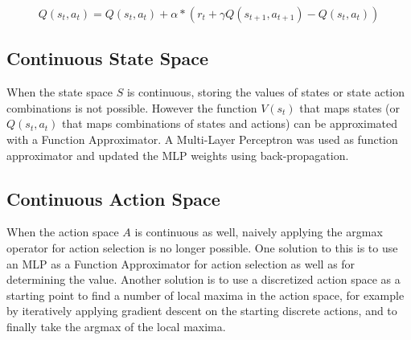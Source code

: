 \begin{equation}
\label{eq:upd_q}
Q(s_t,a_t) = Q(s_t,a_t) + \alpha*(r_t + \gamma Q(s_{t+1},a_{t+1}) - Q(s_t, a_t))
\end{equation}

\subsection{Continuous State Space}

When the state space $S$ is continuous, storing the values of states or state action combinations is not possible. However the function $V(s_t)$ that maps states (or $Q(s_t,a_t)$ that maps combinations of states and actions) can be approximated with a Function Approximator. A Multi-Layer Perceptron was used as function approximator and updated the MLP weights using back-propagation.

\subsection{Continuous Action Space}

When the action space $A$ is continuous as well, naively applying the argmax operator for action selection is no longer possible. One solution to this is to use an MLP as a Function Approximator for action selection as well as for determining the value. Another solution is to use a discretized action space as a starting point to find a number of local maxima in the action space, for example by iteratively applying gradient descent on the starting discrete actions, and to finally take the argmax of the local maxima.

